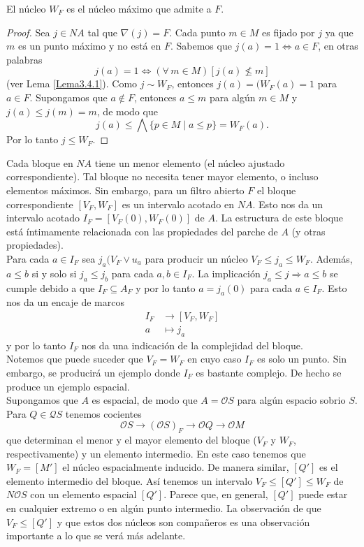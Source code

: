 \begin{lem}
    El núcleo $W_F$ es el núcleo máximo que admite a $F$. 
\end{lem}

\begin{proof}
    Sea $j\in NA$ tal que $\nabla (j)=F$. Cada punto $m\in M$ es fijado por $j$ ya que $m$ es un punto máximo y no está en $F$. Sabemos que $j(a)=1\Leftrightarrow a\in F$, en otras palabras 
    \[
    j(a)=1\Leftrightarrow (\forall \, m\in M)[j(a)\nleq m] 
    \]
    (ver Lema \ref{Lema3.4.1}). Como $j\sim W_F$, entonces $j(a)=(W_F(a)=1$ para $a\in F$. Supongamos que $a\notin F$, entonces $a\leq m$ para algún $m\in M$ y $j(a)\leq j(m)=m$, de modo que 
    \[
    j(a)\leq \bigwedge \{p\in M\mid a\leq p\}=W_F(a).
    \]
    Por lo tanto $j\leq W_F$.
\end{proof}

Cada bloque en $NA$ tiene un menor elemento (el núcleo ajustado correspondiente). Tal bloque no necesita tener mayor elemento, o incluso elementos máximos. Sin embargo, para un filtro abierto $F$ el bloque correspondiente $[V_F, W_F]$ es un intervalo acotado en $NA$. Esto nos da un intervalo acotado $I_F=[V_F(0), W_F(0)]$ de $A$. La estructura de este bloque está íntimamente relacionada con las propiedades del parche de $A$ (y otras propiedades).\\

Para cada $a\in I_F$ sea $j_a(V_F\vee u_a$ para producir un núcleo $V_F\leq j_a\leq W_F$. Además, $a\leq b$ si y solo si $j_a\leq j_b$ para cada $a, b\in I_F$. La implicación $j_a\leq j\Rightarrow a\leq b$ se cumple debido a que $I_F\subseteq A_F$ y por lo tanto $a=j_a(0)$ para cada $a\in I_F$. Esto nos da un encaje de marcos 
\[
\begin{split}
    I_F &\to [V_F, W_F]\\
    a & \mapsto j_a
\end{split}
\]
y por lo tanto $I_F$ nos da una indicación de la complejidad del bloque.\\

Notemos que puede suceder que $V_F=W_F$ en cuyo caso $I_F$ es solo un punto. Sin embargo, se producirá un ejemplo donde $I_F$ es bastante complejo. De hecho se produce un ejemplo espacial.\\

Supongamos que $A$ es espacial, de modo que $A=\mathcal{O}S$ para algún espacio sobrio $S$. Para $Q\in \mathcal{Q}S$ tenemos cocientes 
\[
\mathcal{O}S\to (\mathcal{O}S)_F\to \mathcal{O}Q\to \mathcal{O}M
\]
que determinan el menor y el mayor elemento del bloque ($V_F$ y $W_F$, respectivamente) y un elemento intermedio. En este caso tenemos que $W_F=[M']$ el núcleo espacialmente inducido. De manera similar, $[Q']$ es el elemento intermedio del bloque. Así tenemos un intervalo $V_F\leq [Q']\leq W_F$ de $N\mathcal{O}S$ con un elemento espacial $[Q']$. Parece que, en general, $[Q']$ puede estar en cualquier extremo o en algún punto intermedio. La observación de que $V_F\leq [Q']$ y que estos dos núcleos son compañeros es una observación importante a lo que se verá más adelante.\\

